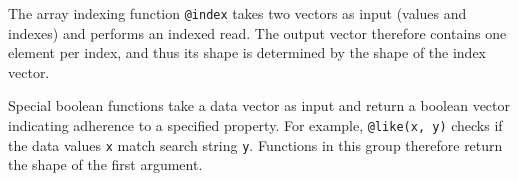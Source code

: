 The array indexing function \texttt{@index} takes two vectors as input (values and
indexes) and performs an indexed read. The output vector therefore contains one element
per index, and thus its shape is determined by the shape of the index vector.

\begin{comment}
\begin{table}[htbp]
\centering
\caption{Rules for Array Indexing (X)} \label{rule_indexing}
\begin{small}
\begin{tabular}{|c||c|c|c|c|}
\hline
$F_{X}$(x,y) & \multicolumn{4}{c|}{x} \\ \hline
y            & \shapeS & \shapeV{$c_0$} & \shapeV{$d_0$} & \shapeVS{$a_0$} \\ \hline
\shapeS        & \shapeS  & \shapeS  & \shapeS  & \shapeS  \\ 
\shapeV{$c_1$} & \shapeV{$c_1$} & \shapeV{$c_1$} & \shapeV{$c_1$} & \shapeV{$c_1$} \\ 
\shapeV{$d_1$} & \shapeV{$d_1$} & \shapeV{$d_1$} & \shapeV{$d_1$} & \shapeV{$d_1$} \\ 
\shapeVS{$a_1$} & \shapeVS{$a_1$} & \shapeVS{$a_1$} & \shapeVS{$a_1$} & \shapeVS{$a_1$} \\ \hline
\end{tabular}
\end{small}
\end{table}
\end{comment}

Special boolean functions take a data vector as input and return a boolean vector
indicating adherence to a specified property. For example, \texttt{@like(x, y)} checks
if the data values \texttt{x} match search string \texttt{y}. Functions in this group
therefore return the shape of the first argument.

